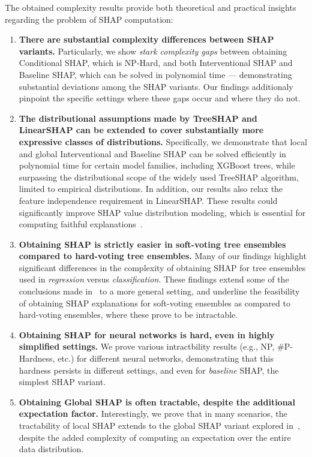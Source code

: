 The obtained complexity results provide both theoretical and practical  insights regarding the problem of SHAP computation:

\begin{enumerate}
\item \textbf{There are substantial complexity differences between SHAP variants.} Particularly, we show \emph{stark complexity gaps} between obtaining Conditional SHAP, which is NP-Hard, and both Interventional SHAP and Baseline SHAP, which can be solved in polynomial time --- demonstrating substantial deviations among the SHAP variants. Our findings additionaly pinpoint the specific settings where these gaps occur and where they do not.
\item \textbf{The distributional assumptions made by TreeSHAP and LinearSHAP can be extended to cover substantially more expressive classes of distributions.} Specifically, we demonstrate that local and global Interventional and Baseline SHAP can be solved efficiently in polynomial time for certain model families, including XGBoost trees, while surpassing the distributional scope of the widely used TreeSHAP algorithm, limited to empirical distributions. In addition, our results also relax the feature independence requirement in LinearSHAP. These results could significantly improve SHAP value distribution modeling, which is essential for computing faithful explanations~\citep{aas2021explaining}.
\item \textbf{Obtaining SHAP is strictly easier in soft-voting tree ensembles compared to hard-voting tree ensembles.} Many of our findings highlight significant differences in the complexity of obtaining SHAP for tree ensembles used in \emph{regression} versus \emph{classification}. These findings extend some of the conclusions made in~\citep{huangupdates} to a more general setting, and underline the feasibility of obtaining SHAP explanations for soft-voting ensembles as compared to hard-voting ensembles, where these prove to be intractable.
\item \textbf{Obtaining SHAP for neural networks is hard, even in highly simplified settings.} We prove various intractbility results (e.g., NP, $\#$P-Hardness, etc.) for different neural networks, demonstrating that this hardness persists in different settings, and even for \emph{baseline} SHAP, the simplest SHAP variant.
\item \textbf{Obtaining Global SHAP is often tractable, despite the additional expectation factor.} Interestingly, we prove that in many scenarios, the tractability of local SHAP extends to the global SHAP variant explored in~\citep{frye20}, despite the added complexity of computing an expectation over the entire data distribution.\end{enumerate}




